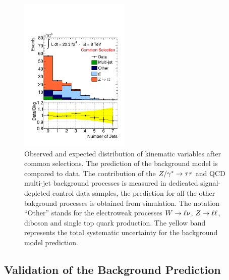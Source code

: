 \begin{figure}[p]
\begin{center}
            \includegraphics[width=0.47\textwidth]{figure/final_plots/std_presel_nJet_tag.pdf}


    \end{center}
    \caption{ 
	Observed and expected distribution of  kinematic variables after common selections. 
	The prediction of the  background model is compared to  data.
	The contribution of the $Z/\gamma^*\rightarrow \tau\tau$ and QCD multi-jet background processes is measured in  dedicated  signal-depleted control data samples,
	the prediction for all the other bakground processes is obtained from simulation.
 	The notation ``Other'' stands 	for the electroweak processes $W\rightarrow \ell \nu$, $Z\rightarrow \ell \ell$, diboson and single top quark production.
	The yellow band represents the total systematic uncertainty for the background model prediction.}
   \label{fig:validation}
\end{figure}



\subsection{Validation of the \ttbar Background Prediction}
\label{sec:top_est}

